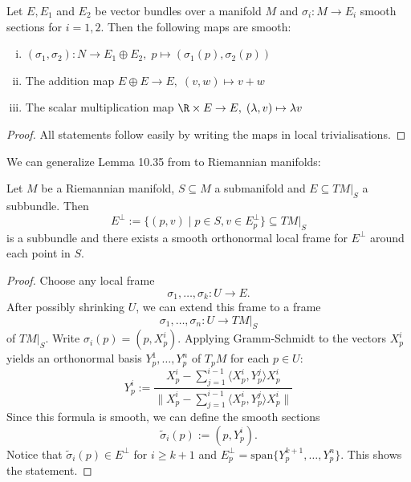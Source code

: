     \begin{lemma}
        Let $E, E_1$ and $E_2$ be vector bundles over a manifold $M$ and $\sigma_i \colon M \to E_i$ smooth sections for $i = 1,2$. Then the following maps are smooth:
        \begin{enumerate}[(i)]
            \item $(\sigma_1,\sigma_2) \colon N \to E_1 \oplus E_2, \; p \mapsto (\sigma_1(p),\sigma_2(p))$
            \item The addition map $E \oplus E \to E, \; (v,w) \mapsto v+w$
            \item The scalar multiplication map $\R \times E \to E,\; (\lambda,v) \mapsto \lambda v$
        \end{enumerate}
    \end{lemma}
    \begin{proof}
        All statements follow easily by writing the maps in local trivialisations.
    \end{proof}



    We can generalize Lemma 10.35 from \cite{lee2011smooth} to Riemannian manifolds:

    \begin{lemma}
        \label{lem:orthogonal_complement_bundles}
        Let $M$ be a Riemannian manifold, $S \subseteq M$ a submanifold and $E \subseteq TM|_S$ a subbundle. Then
        \[
        E^\perp := \{(p,v) \mid p \in S, v \in E_p^\perp\} \subseteq TM|_S
        \]
        is a subbundle and there exists a smooth orthonormal local frame for $E^\perp$ around each point in $S$.
    \end{lemma}
    \begin{proof}
        Choose any local frame 
        \[\sigma_1,\ldots,\sigma_k \colon U \to E.\]
        After possibly shrinking $U$, we can extend this frame to a frame 
        \[\sigma_1,\ldots,\sigma_n \colon U \to TM|_S\]
        of $TM|_S$. Write $\sigma_i(p) = (p,X_p^i)$. Applying Gramm-Schmidt to the vectors $X_p^i$ yields an orthonormal basis $Y_p^1,\ldots,Y_p^n$ of $T_pM$ for each $p \in U$:
        \[Y_p^i := \frac{X_p^i - \sum_{j=1}^{i-1}\langle X_p^i,Y_p^{j} \rangle X_p^i}{\lVert X_p^i - \sum_{j=1}^{i-1}\langle X_p^i,Y_p^{j} \rangle X_p^i \rVert}\]
        Since this formula is smooth, we can define the smooth sections 
        \[\tilde{\sigma}_i(p) := (p,Y_p^i).\]
        Notice that $\tilde{\sigma}_i(p) \in E^\perp$ for $i \geq k+1$ and $E_p^\perp = \mathrm{span}\{Y_p^{k+1},\ldots,Y_p^n\}$. This shows the statement. 
    \end{proof}


